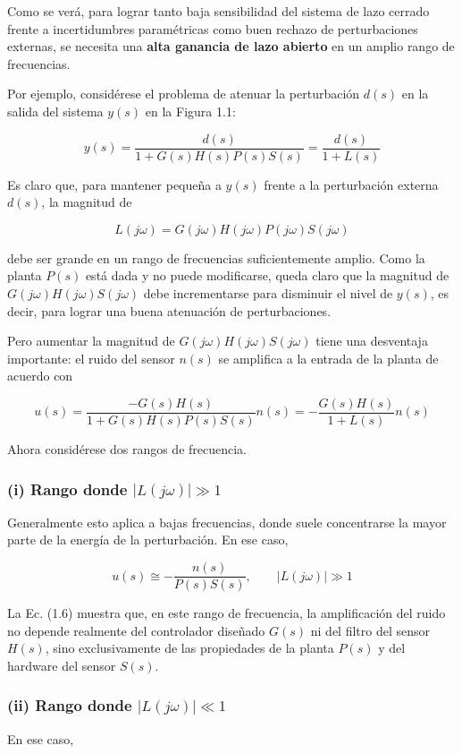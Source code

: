 Como se verá, para lograr tanto baja sensibilidad del sistema de lazo cerrado frente a incertidumbres paramétricas como buen rechazo de perturbaciones externas, se necesita una \textbf{alta ganancia de lazo abierto} en un amplio rango de frecuencias.

Por ejemplo, considérese el problema de atenuar la perturbación \(d(s)\) en la salida del sistema \(y(s)\) en la Figura 1.1:

\[
 y(s)=\frac{d(s)}{1+G(s)H(s)P(s)S(s)}=\frac{d(s)}{1+L(s)} \tag{1.4}
\]

Es claro que, para mantener pequeña a \(y(s)\) frente a la perturbación externa \(d(s)\), la magnitud de

\[
L(j\omega)=G(j\omega)H(j\omega)P(j\omega)S(j\omega)
\]

debe ser grande en un rango de frecuencias suficientemente amplio. Como la planta \(P(s)\) está dada y no puede modificarse, queda claro que la magnitud de \(G(j\omega)H(j\omega)S(j\omega)\) debe incrementarse para disminuir el nivel de \(y(s)\), es decir, para lograr una buena atenuación de perturbaciones.

Pero aumentar la magnitud de \(G(j\omega)H(j\omega)S(j\omega)\) tiene una desventaja importante: el ruido del sensor \(n(s)\) se amplifica a la entrada de la planta de acuerdo con

\[
 u(s)=\frac{-G(s)H(s)}{1+G(s)H(s)P(s)S(s)}n(s)= -\frac{G(s)H(s)}{1+L(s)}n(s) \tag{1.5}
\]

Ahora considérese dos rangos de frecuencia.

\subsubsection{(i) Rango donde \(|L(j\omega)| \gg 1\)}
Generalmente esto aplica a bajas frecuencias, donde suele concentrarse la mayor parte de la energía de la perturbación. En ese caso,

\[
 u(s) \cong -\frac{n(s)}{P(s)S(s)}, \qquad |L(j\omega)| \gg 1 \tag{1.6}
\]

La Ec. (1.6) muestra que, en este rango de frecuencia, la amplificación del ruido no depende realmente del controlador diseñado \(G(s)\) ni del filtro del sensor \(H(s)\), sino exclusivamente de las propiedades de la planta \(P(s)\) y del hardware del sensor \(S(s)\).

\subsubsection{(ii) Rango donde \(|L(j\omega)| \ll 1\)}
En ese caso,

